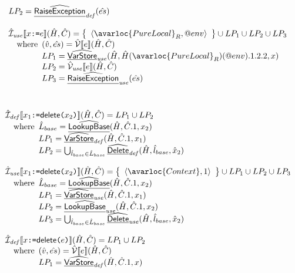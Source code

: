 \[\begin{array}{l}
{    LP_2 = \ahf{RaiseException}_{\it def}(\hat{es})
  }
  \\\\
  \aI_{\it use}\lbr x\TT{:=}e\rbr(\hat{H},\hat{C})
  = \set{\langle \avarloc{PureLocal}_R, \varprop{env}\rangle} \cup LP_1 \cup LP_2 \cup LP_3\\
  \quad\wherec{
    (\hat{v},\hat{es}) = \aV\lbr e\rbr(\hat{H},\hat{C})\\
    LP_1 = \ahf{VarStore}_{\it use}(\hat{H}, \hat{H}(\avarloc{PureLocal}_R)(\varprop{env}).1.2.2, x)\\
    LP_2 = \aV_{\it use}\lbr e\rbr(\hat{H},\hat{C})\\
    LP_3 = \ahf{RaiseException}_{\it use}(\hat{es})
  }
\end{array}
\]
\[
\begin{array}{l}
  \\\\
  \aI_{\it def}\lbr x_1 \TT{:=} \SF{delete}\TT{(}x_2\TT{)} \rbr(\hat{H},\hat{C})
  = LP_1\cup LP_2\\
  \quad\wherec{
    \hat{L}_{base}=\ahf{LookupBase}(\hat{H},\hat{C}.1,x_2)\\
    LP_1 = \ahf{VarStore}_{\it def}(\hat{H}, \hat{C}.1, x_1)\\
    LP_2 = \bigcup_{\hat{l}_{base}\in\hat{L}_{base}}\ahf{Delete}_{\it def}(\hat{H},\hat{l}_{base},\hat{x}_2)\\
  }
  \\\\
  \aI_{\it use}\lbr x_1 \TT{:=} \SF{delete}\TT{(}x_2\TT{)} \rbr(\hat{H},\hat{C})
  = \set{\langle \avarloc{Context}, 1\rangle} \cup LP_1 \cup LP_2\cup LP_3\\
  \quad\wherec{
    \hat{L}_{base}=\ahf{LookupBase}(\hat{H},\hat{C}.1,x_2)\\
    LP_1 = \ahf{VarStore}_{\it use}(\hat{H}, \hat{C}.1, x_1)\\
    LP_2 = \ahf{LookupBase}_{\it use}(\hat{H}, \hat{C}.1, x_2)\\
    LP_3 = \bigcup_{\hat{l}_{base}\in\hat{L}_{base}}\ahf{Delete}_{\it use}(\hat{H},\hat{l}_{base},\hat{x}_2)\\
  }
  \\\\
  \aI_{\it def}\lbr x \TT{:=} \SF{delete}\TT{(}e\TT{)} \rbr(\hat{H},\hat{C})
  = LP_1 \cup LP_2\\
  \quad\wherec{
    (\hat{v},\hat{es}) = \aV\lbr e\rbr(\hat{H},\hat{C})\\
    LP_1 = \ahf{VarStore}_{\it def}(\hat{H}, \hat{C}.1, x)\\
}
\end{array}\]

